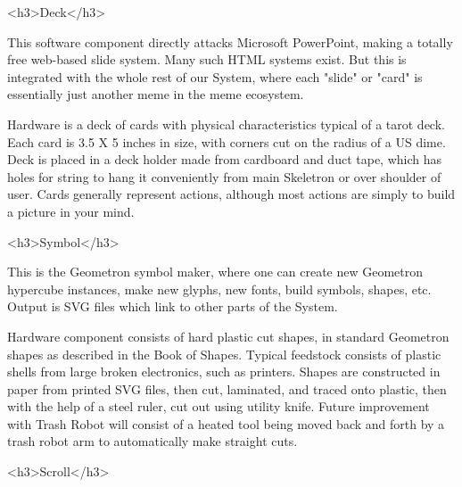 \documentclass[11pt]{article}
\begin{document}
<h3>Deck</h3>



    This software component directly attacks Microsoft PowerPoint, making a totally free web-based slide system.  Many such HTML systems exist.  But this is integrated with the whole rest of our System, where each "slide" or "card" is essentially just another meme in the meme ecosystem.




    Hardware is a deck of cards with physical characteristics typical of a tarot deck.  Each card is 3.5 X 5 inches in size, with corners cut on the radius of a US dime.  Deck is placed in a  deck holder made from cardboard and duct tape, which has holes for string to hang it conveniently from main Skeletron or over shoulder of user.  Cards generally represent actions, although most actions are simply to build a picture in your mind.  


<h3>Symbol</h3>



    This is the Geometron symbol maker, where one can create new Geometron hypercube instances, make new glyphs, new fonts, build symbols, shapes, etc. Output is SVG files which link to other parts of the System.




    Hardware component consists of hard plastic cut shapes, in standard Geometron shapes as described in the Book of Shapes.  Typical feedstock consists of plastic shells from large broken electronics, such as printers.  Shapes are constructed in paper from printed SVG files, then cut, laminated, and traced onto plastic, then with the help of a steel ruler, cut out using utility knife.  Future improvement with Trash Robot will consist of a heated tool being moved back and forth by a trash robot arm to automatically make straight cuts.  

<h3>Scroll</h3>



    
\end{document}
